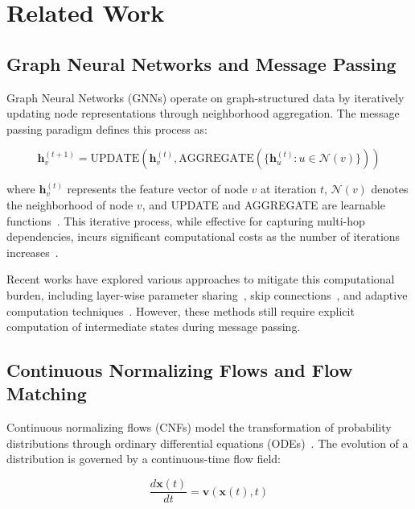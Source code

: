 \documentclass{article}
\begin{document}
\section{Related Work}

\subsection{Graph Neural Networks and Message Passing}

Graph Neural Networks (GNNs) operate on graph-structured data by iteratively updating node representations through neighborhood aggregation. 
The message passing paradigm defines this process as:

\begin{equation}
\mathbf{h}_v^{(t+1)} = \text{UPDATE}\left(\mathbf{h}_v^{(t)}, \text{AGGREGATE}\left(\{\mathbf{h}_u^{(t)} : u \in \mathcal{N}(v)\}\right)\right)
\end{equation}

where $\mathbf{h}_v^{(t)}$ represents the feature vector of node $v$ at iteration $t$, $\mathcal{N}(v)$ denotes the neighborhood of node $v$, and UPDATE and AGGREGATE are learnable functions~\citep{gilmer2017neural, hamilton2017inductive}. 
This iterative process, while effective for capturing multi-hop dependencies, incurs significant computational costs as the number of iterations increases~\citep{xu2018representation}.

Recent works have explored various approaches to mitigate this computational burden, including layer-wise parameter sharing~\citep{wu2020comprehensive}, skip connections~\citep{li2019deepgcns}, and adaptive computation techniques~\citep{huang2020combining}. 
However, these methods still require explicit computation of intermediate states during message passing.

\subsection{Continuous Normalizing Flows and Flow Matching}

Continuous normalizing flows (CNFs) model the transformation of probability distributions through ordinary differential equations (ODEs)~\citep{chen2018neural}. 
The evolution of a distribution is governed by a continuous-time flow field:

\begin{equation}
\frac{d\mathbf{x}(t)}{dt} = \mathbf{v}(\mathbf{x}(t), t)
\end{equation}
\end{document}
